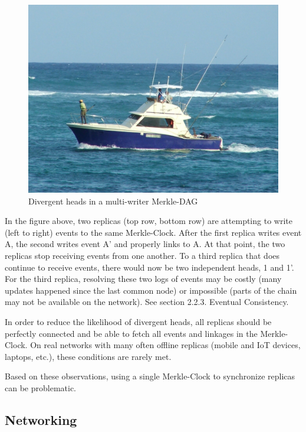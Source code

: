 \documentclass{comjnl}
\begin{document}
\begin{figure}
  \includegraphics[width=\linewidth]{boat.jpg}
  \caption{Divergent heads in a multi-writer Merkle-DAG }
  \label{fig:merkledag}
\end{figure}

In the figure above, two replicas (top row, bottom row) are attempting to write (left to right) events to the same Merkle-Clock. After the first replica writes event A, the second writes event A’ and properly links to A. At that point, the two replicas stop receiving events from one another. To a third replica that does continue to receive events, there would now be two independent heads, 1 and 1’. For the third replica, resolving these two logs of events may be costly (many updates happened since the last common node) or impossible (parts of the chain may not be available on the network). See section 2.2.3. Eventual Consistency.

In order to reduce the likelihood of divergent heads, all replicas should be perfectly connected and be able to fetch all events and linkages in the Merkle-Clock. On real networks with many often offline replicas (mobile and IoT devices, laptops, etc.), these conditions are rarely met.

Based on these observations, using a single Merkle-Clock to synchronize replicas can be problematic.

\subsection{Networking}
\end{document}
